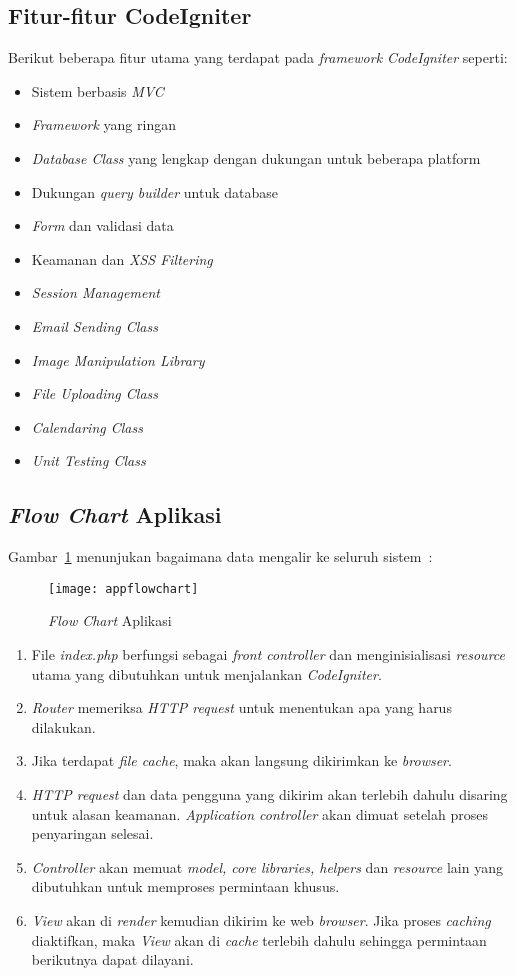 \subsection{Fitur-fitur CodeIgniter}
Berikut beberapa fitur utama yang terdapat pada \textit{framework CodeIgniter} seperti:
\begin{itemize}
	\item Sistem berbasis \textit{MVC}
	\item \textit{Framework} yang ringan
	\item \textit{Database Class} yang lengkap dengan dukungan untuk beberapa platform
	\item Dukungan \textit{query builder} untuk database
	\item \textit{Form} dan validasi data
	\item Keamanan dan \textit{XSS Filtering}
	\item \textit{Session Management}
	\item \textit{Email Sending Class}
	\item \textit{Image Manipulation Library}
	\item \textit{File Uploading Class} 
	\item \textit{Calendaring Class}
	\item \textit{Unit Testing Class}
\end{itemize}

\subsection{\textit{Flow Chart} Aplikasi}
Gambar~\ref{fig:flow} menunjukan bagaimana data mengalir ke seluruh sistem~\cite{bcit:17:cidoc}:
\begin{figure}[H]
	\centering  
	\texttt{[image: appflowchart]}  
	\caption[\textit{Flow Chart} Aplikasi]{\textit{Flow Chart} Aplikasi} 
	\label{fig:flow} 
\end{figure} 

\begin{enumerate}
	\item File \textit{index.php} berfungsi sebagai \textit{front controller} dan menginisialisasi \textit{resource} utama yang dibutuhkan untuk menjalankan \textit{CodeIgniter}.
	\item \textit{Router} memeriksa \textit{HTTP request} untuk menentukan apa yang harus dilakukan.
	\item Jika terdapat \textit{file cache}, maka akan langsung dikirimkan ke \textit{browser}.
	\item \textit{HTTP request} dan data pengguna yang dikirim akan terlebih dahulu disaring untuk alasan keamanan. \textit{Application controller} akan dimuat setelah proses penyaringan selesai.
	\item \textit{Controller} akan memuat \textit{model, core libraries, helpers} dan \textit{resource} lain yang dibutuhkan untuk memproses permintaan khusus.
	\item \textit{View} akan di \textit{render} kemudian dikirim ke web \textit{browser}. Jika proses \textit{caching} diaktifkan, maka \textit{View} akan di \textit{cache} terlebih dahulu sehingga permintaan berikutnya dapat dilayani.
\end{enumerate}

